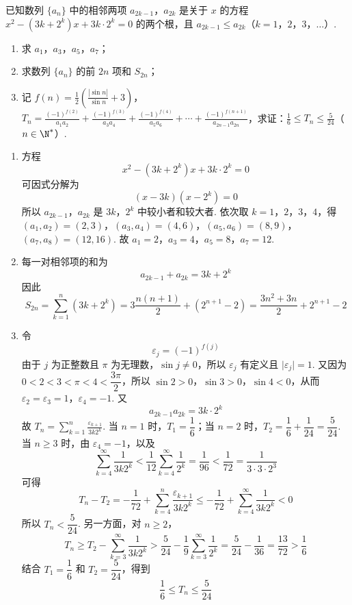\begin{problem}
已知数列 \(\{a_{n}\}\) 中的相邻两项 \(a_{2k-1}\)，\(a_{2k}\) 是关于 \(x\) 的方程 \(x^{2} - (3k + 2^{k})x + 3k \cdot 2^{k} = 0\) 的两个根，且 \(a_{2k-1} \leqslant a_{2k}\)（\(k = 1\)，\(2\)，\(3\)，\(\dots\)）.

\begin{enumerate}
\item 求 \(a_{1}\)，\(a_{3}\)，\(a_{5}\)，\(a_{7}\)；
\item 求数列 \(\{a_{n}\}\) 的前 \(2n\) 项和 \(S_{2n}\)；
\item 记 \(f(n) = \frac{1}{2}\left(\frac{|\sin n|}{\sin n} + 3\right)\)，\(T_n = \frac{(-1)^{f(2)}}{a_1a_2} + \frac{(-1)^{f(3)}}{a_3a_4} + \frac{(-1)^{f(4)}}{a_5a_6} + \cdots + \frac{(-1)^{f(n+1)}}{a_{2n-1}a_{2n}}\)，求证：\(\frac{1}{6} \leqslant T_n \leqslant \frac{5}{24}\)（\(n \in \N^*\)）.
\end{enumerate}

\begin{solution}
\begin{enumerate}
\item 方程
\[
x^2-(3k+2^k)x+3k\cdot2^k=0
\]
可因式分解为
\[
(x-3k)(x-2^k)=0
\]
所以 \(a_{2k-1}\)，\(a_{2k}\) 是 \(3k\)，\(2^k\) 中较小者和较大者. 依次取 \(k=1\)，\(2\)，\(3\)，\(4\)，得
\((a_1,a_2)=(2,3)\)，\((a_3,a_4)=(4,6)\)，\((a_5,a_6)=(8,9)\)，\((a_7,a_8)=(12,16)\).
故 \(a_1=2\)，\(a_3=4\)，\(a_5=8\)，\(a_7=12\).
\item 每一对相邻项的和为
\[
a_{2k-1}+a_{2k}=3k+2^k
\]
因此
\[
S_{2n}=\sum_{k=1}^n(3k+2^k)
=3\frac{n(n+1)}2+\left(2^{n+1}-2\right)
=\frac{3n^2+3n}{2}+2^{n+1}-2
\]
\item 令
\[
\varepsilon_j=(-1)^{f(j)}
\]
由于 \(j\) 为正整数且 \(\pi\) 为无理数，\(\sin j\ne0\)，所以 \(\varepsilon_j\) 有定义且 \(\lvert\varepsilon_j\rvert=1\). 又因为 \(0<2<3<\pi<4<\dfrac{3\pi}{2}\)，所以 \(\sin2>0\)，\(\sin3>0\)，\(\sin4<0\)，从而 \(\varepsilon_2=\varepsilon_3=1\)，\(\varepsilon_4=-1\). 又
\[
a_{2k-1}a_{2k}=3k\cdot2^k
\]
故 \(T_n=\displaystyle\sum_{k=1}^n\frac{\varepsilon_{k+1}}{3k2^k}\).
当 \(n=1\) 时，\(T_1=\dfrac16\)；当 \(n=2\) 时，\(T_2=\dfrac16+\dfrac1{24}=\dfrac5{24}\).
当 \(n\geqslant3\) 时，由 \(\varepsilon_4=-1\)，以及
\[
\sum_{k=4}^{\infty}\frac1{3k2^k}
<\frac1{12}\sum_{k=4}^{\infty}\frac1{2^k}
=\frac1{96}
<\frac1{72}
=\frac1{3\cdot3\cdot2^3}
\]
可得
\[
T_n-T_2
=-\frac1{72}+\sum_{k=4}^n\frac{\varepsilon_{k+1}}{3k2^k}
\leqslant-\frac1{72}+\sum_{k=4}^{\infty}\frac1{3k2^k}<0
\]
所以 \(T_n<\dfrac5{24}\). 另一方面，对 \(n\geqslant2\)，
\[
T_n\geqslant T_2-\sum_{k=3}^{\infty}\frac1{3k2^k}
>\frac5{24}-\frac19\sum_{k=3}^{\infty}\frac1{2^k}
=\frac5{24}-\frac1{36}
=\frac{13}{72}>\frac16
\]
结合 \(T_1=\dfrac16\) 和 \(T_2=\dfrac5{24}\)，得到
\[
\frac16\leqslant T_n\leqslant\frac5{24}
\]
\end{enumerate}
\end{solution}
\end{problem}

